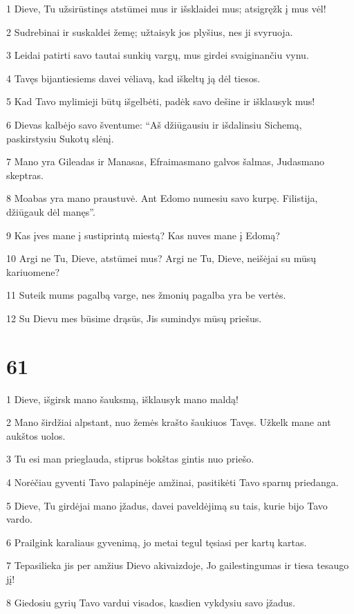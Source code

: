 \par 1 Dieve, Tu užsirūstinęs atstūmei mus ir išsklaidei mus; atsigręžk į mus vėl! 
\par 2 Sudrebinai ir suskaldei žemę; užtaisyk jos plyšius, nes ji svyruoja. 
\par 3 Leidai patirti savo tautai sunkių vargų, mus girdei svaiginančiu vynu. 
\par 4 Tavęs bijantiesiems davei vėliavą, kad iškeltų ją dėl tiesos. 
\par 5 Kad Tavo mylimieji būtų išgelbėti, padėk savo dešine ir išklausyk mus! 
\par 6 Dievas kalbėjo savo šventume: “Aš džiūgausiu ir išdalinsiu Sichemą, paskirstysiu Sukotų slėnį. 
\par 7 Mano yra Gileadas ir Manasas, Efraimas­mano galvos šalmas, Judas­mano skeptras. 
\par 8 Moabas yra mano praustuvė. Ant Edomo numesiu savo kurpę. Filistija, džiūgauk dėl manęs”. 
\par 9 Kas įves mane į sustiprintą miestą? Kas nuves mane į Edomą? 
\par 10 Argi ne Tu, Dieve, atstūmei mus? Argi ne Tu, Dieve, neišėjai su mūsų kariuomene? 
\par 11 Suteik mums pagalbą varge, nes žmonių pagalba yra be vertės. 
\par 12 Su Dievu mes būsime drąsūs, Jis sumindys mūsų priešus.



\chapter{61}


\par 1 Dieve, išgirsk mano šauksmą, išklausyk mano maldą! 
\par 2 Mano širdžiai alpstant, nuo žemės krašto šaukiuos Tavęs. Užkelk mane ant aukštos uolos. 
\par 3 Tu esi man prieglauda, stiprus bokštas gintis nuo priešo. 
\par 4 Norėčiau gyventi Tavo palapinėje amžinai, pasitikėti Tavo sparnų priedanga. 
\par 5 Dieve, Tu girdėjai mano įžadus, davei paveldėjimą su tais, kurie bijo Tavo vardo. 
\par 6 Prailgink karaliaus gyvenimą, jo metai tegul tęsiasi per kartų kartas. 
\par 7 Tepasilieka jis per amžius Dievo akivaizdoje, Jo gailestingumas ir tiesa tesaugo jį! 
\par 8 Giedosiu gyrių Tavo vardui visados, kasdien vykdysiu savo įžadus.



